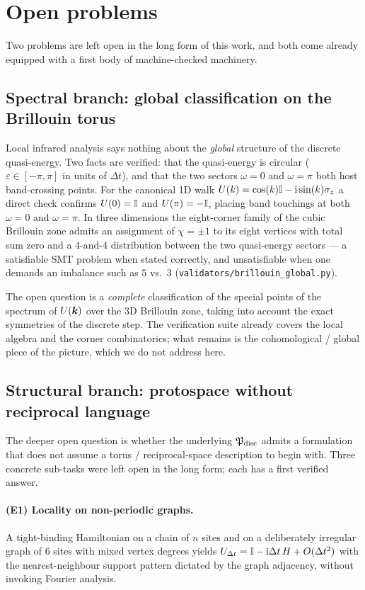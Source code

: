 \section{Open problems}
\label{p:open-problems}

Two problems are left open in the long form of this work, and both come
already equipped with a first body of machine-checked machinery.

\subsection{Spectral branch: global classification on the Brillouin torus}
Local infrared analysis says nothing about the \emph{global} structure
of the discrete quasi-energy. Two facts are verified: that the
quasi-energy is circular ($\varepsilon\in[-\pi,\pi]$ in units of
$\Delta t$), and that the two sectors $\omega=0$ and $\omega=\pi$ both
host band-crossing points. For the canonical 1D walk
$U(k) = \cos(k)\mathbb{I} - \mathrm{i}\sin(k)\sigma_{z}$ a direct check confirms
$U(0)=\mathbb{I}$ and $U(\pi)=-\mathbb{I}$, placing band touchings at both
$\omega=0$ and $\omega=\pi$. In three dimensions the eight-corner family
of the cubic Brillouin zone admits an assignment of $\chi=\pm 1$ to its
eight vertices with total sum zero and a $4$-and-$4$ distribution
between the two quasi-energy sectors --- a satisfiable SMT problem when
stated correctly, and unsatisfiable when one demands an imbalance such
as $5$ vs.\ $3$
(\texttt{validators/brillouin\_global.py}).

The open question is a \emph{complete} classification of the special
points of the spectrum of $U(\bm{k})$ over the 3D Brillouin zone,
taking into account the exact symmetries of the discrete step. The
verification suite already covers the local algebra and the corner
combinatorics; what remains is the cohomological / global piece of the
picture, which we do not address here.

\subsection{Structural branch: protospace without reciprocal language}
The deeper open question is whether the underlying $\mathfrak{P}_{\mathrm{disc}}$ admits a
formulation that does not assume a torus / reciprocal-space description
to begin with. Three concrete sub-tasks were left open in the long
form; each has a first verified answer.

\paragraph{(E1) Locality on non-periodic graphs.}
A tight-binding Hamiltonian on a chain of $n$ sites and on a
deliberately irregular graph of $6$ sites with mixed vertex degrees
yields $U_{\Delta t} = \mathbb{I} - \mathrm{i}\Delta t\,H + O(\Delta t^{2})$
with the nearest-neighbour support pattern dictated by the graph
adjacency, without invoking Fourier analysis.

